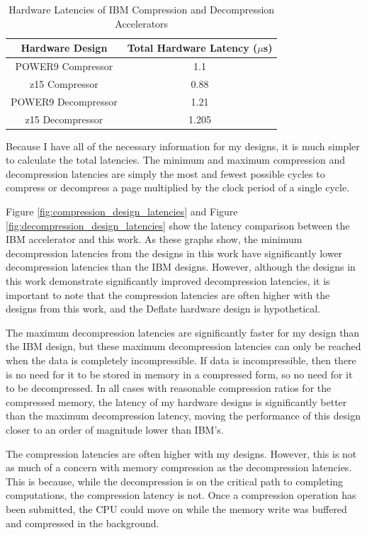 \documentclass[doublespace,nopageskip]{VTthesis}
\begin{document}
\begin{table}[htb]
	\centering
	\caption{Hardware Latencies of IBM Compression and Decompression Accelerators}
	\begin{tabular}{cc}
	    \toprule
	    Hardware Design & Total Hardware Latency ($\mu$s) \\
		\midrule
		POWER9 Compressor & 1.1 \\
		\midrule
		z15 Compressor & 0.88 \\
		\midrule
		POWER9 Decompressor & 1.21 \\
		\midrule
		z15 Decompressor & 1.205 \\
		\bottomrule
	\end{tabular}
	\label{tab:ibm_latencies}
\end{table}

Because I have all of the necessary information for my designs, it is much simpler to calculate the total latencies. The minimum and maximum compression and decompression latencies are simply the most and fewest possible cycles to compress or decompress a page multiplied by the clock period of a single cycle.

Figure \ref{fig:compression_design_latencies} and Figure \ref{fig:decompression_design_latencies} show the latency comparison between the IBM accelerator and this work. As these graphs show, the minimum decompression latencies from the designs in this work have significantly lower decompression latencies than the IBM designs. However, although the designs in this work demonstrate significantly improved decompression latencies, it is important to note that the compression latencies are often higher with the designs from this work, and the Deflate hardware design is hypothetical.

The maximum decompression latencies are significantly faster for my design than the IBM design, but these maximum decompression latencies can only be reached when the data is completely incompressible. If data is incompressible, then there is no need for it to be stored in memory in a compressed form, so no need for it to be decompressed. In all cases with reasonable compression ratios for the compressed memory, the latency of my hardware designs is significantly better than the maximum decompression latency, moving the performance of this design closer to an order of magnitude lower than IBM's.

The compression latencies are often higher with my designs. However, this is not as much of a concern with memory compression as the decompression latencies. This is because, while the decompression is on the critical path to completing computations, the compression latency is not. Once a compression operation has been submitted, the CPU could move on while the memory write was buffered and compressed in the background.
\end{document}
